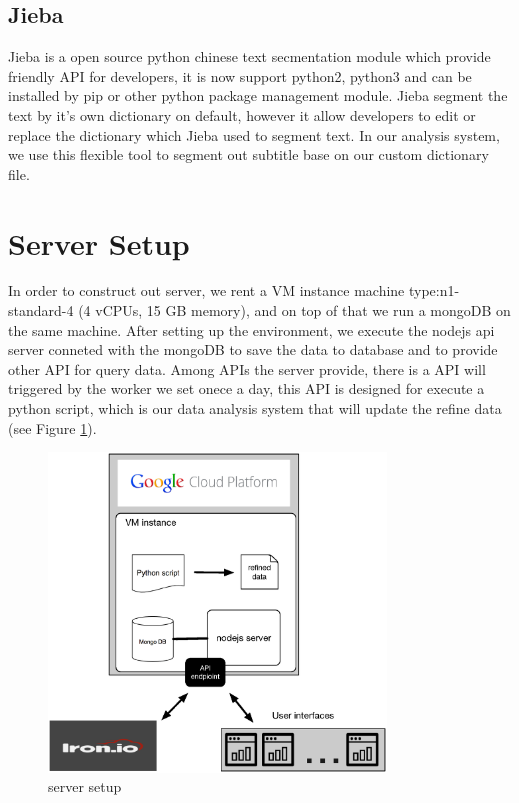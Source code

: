 \subsection{Jieba}
Jieba \cite{jieba} is a open source python chinese text secmentation module which provide friendly API for developers, it is now support python2, python3 and can be installed by pip or other python package management module.
Jieba segment the text by it's own dictionary on default, however it allow developers to edit or replace the dictionary which Jieba used to segment text.
In our analysis system, we use this flexible tool to segment out subtitle base on our custom dictionary file.

\section{Server Setup}
In order to construct out server, we rent a VM instance machine type:n1-standard-4 (4 vCPUs, 15 GB memory), and on top of that we run a mongoDB on the same machine.
After setting up the environment, we execute the nodejs api server conneted with the mongoDB to save the data to database and to provide other API for query data.
Among APIs the server provide, there is a API will triggered by the worker we set onece a day, this API is designed for execute a python script, which is our data analysis system that will update the refine data (see Figure \ref{fig:serversetup}).
\begin{figure}[H]
    \centering
    \includegraphics[width = 0.8\textwidth]{fig/serversetup.eps}
    \caption{server setup}
    \label{fig:serversetup}
\end{figure}

